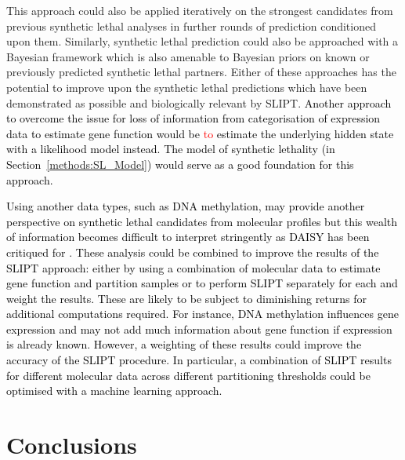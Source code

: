 This approach could also be applied iteratively on the strongest candidates from previous \gls{synthetic lethal} analyses in further rounds of prediction conditioned upon them. Similarly, \gls{synthetic lethal} prediction could also be approached with a Bayesian framework \citep{Friedman2000, Jansen2003, Imoto2004} which is also amenable to Bayesian priors on known or previously predicted \gls{synthetic lethal} partners. Either of these approaches has the potential to improve upon the \gls{synthetic lethal} predictions which have been demonstrated as possible and biologically relevant by \gls{SLIPT}. \textcolor{black}{Another approach to overcome the issue for loss of information from categorisation of expression data to estimate gene function would be \textcolor{red}{to} estimate the underlying hidden state with a likelihood model instead. The model of synthetic lethality (in Section~\ref{methods:SL_Model}) would serve as a good foundation for this approach.}

\textcolor{black}{
Using another data types, such as DNA methylation, may provide another perspective on synthetic lethal candidates from molecular profiles but this wealth of information becomes difficult to interpret stringently as \gls{DAISY} has been critiqued for \citep{Lu2015}. These analysis could be combined to improve the results of the SLIPT approach: either by using a combination of molecular data to estimate gene function and partition samples or to perform SLIPT separately for each and weight the results. These are likely to be subject to diminishing returns for additional computations required. For instance, DNA methylation influences gene expression and may not add much information about gene function if expression is already known. However, a weighting of these results could improve the accuracy of the SLIPT procedure. In particular, a combination of SLIPT results for different molecular data across different partitioning thresholds could be optimised with a machine learning approach.   
}
\section{Conclusions}
\label{chap:conclusion}

